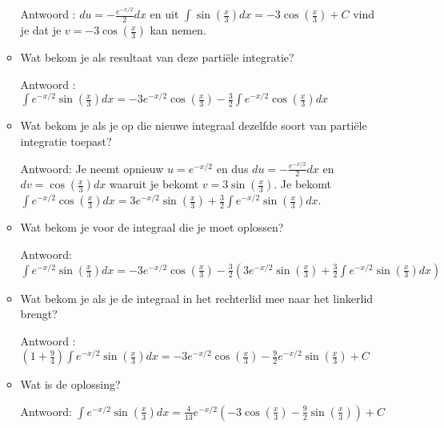\documentclass{article}
\begin{document}
\begin{enumerate}
\begin{itemize}
Antwoord : $du=-\frac{e^{-x/2}}{2}dx$ en uit $\int \sin \left( \frac{x}{3}  \right)dx=-3 \cos \left( \frac{x}{3}  \right)+C$ vind je dat je $v=-3 \cos \left( \frac{x}{3}  \right)$ kan nemen.

\item Wat bekom je als resultaat van deze parti\"ele integratie?

Antwoord :  $\int e^{-x/2}\sin \left( \frac{x}{3}  \right)dx=-3e^{-x/2} \cos \left( \frac{x}{3}  \right)-\frac{3}{2} \int e^{-x/2}\cos \left( \frac{x}{3}  \right)dx$

\item Wat bekom je als je op die nieuwe integraal dezelfde soort van parti\"ele integratie toepast?

Antwoord: Je neemt opnieuw $u=e^{-x/2}$ en dus $du=-\frac{e^{-x/2}}{2}dx$ en $dv=\cos \left( \frac{x}{3}  \right)dx$ waaruit je bekomt $v=3 \sin \left( \frac{x}{3}  \right)$.
Je bekomt $\int e^{-x/2}\cos \left( \frac{x}{3}  \right)dx=3e^{-x/2}\sin \left( \frac{x}{3}  \right)+\frac{3}{2}\int e^{-x/2}\sin \left( \frac{x}{3}  \right)dx$.

\item Wat bekom je voor de integraal die je moet oplossen?

Antwoord: $\int e^{-x/2}\sin \left( \frac{x}{3}  \right)dx=-3e^{-x/2} \cos \left( \frac{x}{3}  \right)-\frac{3}{2} \left(  3e^{-x/2}\sin \left( \frac{x}{3}  \right)+\frac{3}{2}\int e^{-x/2}\sin \left( \frac{x}{3}  \right)dx \right)$

\item Wat bekom je als je de integraal in het rechterlid mee naar het linkerlid brengt?

Antwoord : $\left(  1+\frac{9}{4} \right)\int e^{-x/2}\sin \left( \frac{x}{3}  \right)dx=-3e^{-x/2} \cos \left( \frac{x}{3}  \right)-\frac{9}{2} e^{-x/2}\sin \left( \frac{x}{3}  \right)+C$

\item Wat is de oplossing?

Antwoord: $\int e^{-x/2}\sin \left( \frac{x}{3}  \right)dx=\frac{4}{13}e^{-x/2} \left( -3 \cos \left( \frac{x}{3}  \right)-\frac{9}{2}\sin \left( \frac{x}{3}  \right) \right)+C$

\end{itemize}

\end{enumerate}
\end{document}

